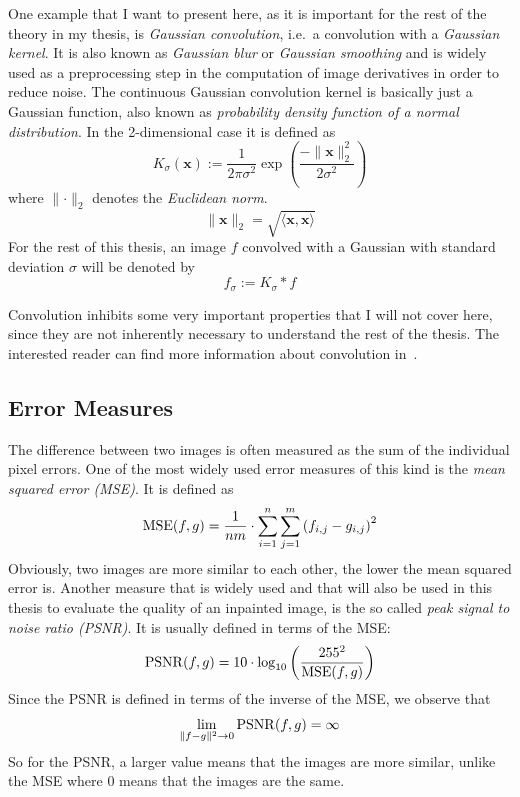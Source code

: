 One example that I want to present here, as it is important for the rest of the theory in my
thesis, is \textit{Gaussian convolution}, i.e.\ a convolution with a
\textit{Gaussian kernel}. It is also known as \textit{Gaussian blur} or \textit{Gaussian
smoothing} and is widely used as a preprocessing step in the computation of image derivatives in
order to reduce noise.
The continuous Gaussian convolution kernel is basically just a Gaussian function, also known as
\textit{probability density function of a normal distribution}. In the 2-dimensional case it is defined as
\begin{equation}
    K_\sigma (\boldsymbol x) := \frac{1}{2\pi\sigma^2}\exp\left(\frac{-\lVert\boldsymbol
            x\rVert_2^2}{2\sigma^2}\right)
\end{equation}
where $\lVert \cdot \rVert_2$ denotes the \textit{Euclidean norm}.
\begin{equation}
    \lVert \mathbf{x} \lVert_2 = \sqrt{\langle \mathbf{x}, \mathbf{x} \rangle}
\end{equation}
For the rest of this thesis, an image $f$ convolved with a Gaussian with standard deviation $\sigma$
will be denoted by \[f_\sigma := K_\sigma * f\]

Convolution inhibits some very important properties that I will not cover here, since they are not
inherently necessary to understand the rest of the thesis. The interested reader can find more
information about convolution in~\cite{dspguide, ipcv}.

\subsection{Error Measures}\label{sec:ErrorMeasure}

The difference between two images is often measured as the sum of the individual pixel errors. 
One of the most widely used error measures of this kind is the \textit{mean squared error (MSE)}. It is
defined as 
\begin{equation}
    \operatorname{MSE}(f, g) = \frac{1}{nm}\cdot\sum_{i=1}^{n}\sum_{j=1}^{m} {(f_{i,j} - g_{i,j})}^2
\end{equation}
Obviously, two images are more similar to each other, the lower the mean squared error is.
Another measure that is widely used and that will also be used in this thesis to evaluate the
quality of an inpainted image, is the so called \textit{peak signal to noise ratio (PSNR)}. 
It is usually defined in terms of the MSE\@:
\begin{equation}
    \operatorname{PSNR}(f, g) = 10 \cdot \log_{10}\left({\frac{255^2}{\operatorname{MSE}(f, g)}}\right)
\end{equation}
Since the PSNR is defined in terms of the inverse of the MSE, we observe that
\begin{equation}
    \lim_{\lVert f-g \rVert^2\to 0}\operatorname{PSNR}(f, g) = \infty
\end{equation}
So for the PSNR, a larger value means that the images are more similar, unlike the MSE where 0 
means that the images are the same. 


